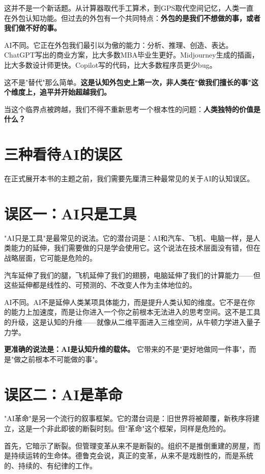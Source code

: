 这并不是一个新话题。从计算器取代手工算术，到GPS取代空间记忆，人类一直在外包认知功能。但过去的外包有一个共同特点：\textbf{外包的是我们不想做的事，或者我们做不好的事。}

AI不同。它正在外包我们最引以为傲的能力：分析、推理、创造、表达。ChatGPT写出的商业方案，比大多数MBA毕业生更好。Midjourney生成的插画，比大多数设计师更快。Copilot写的代码，比大多数程序员更少bug。

这不是"替代"那么简单。\textbf{这是认知外包史上第一次，非人类在"做我们擅长的事"这个维度上，追平并开始超越我们。}

当这个临界点被跨越，我们不得不重新思考一个根本性的问题：\textbf{人类独特的价值是什么？}


\section{三种看待AI的误区}


在正式展开本书的主题之前，我们需要先厘清三种最常见的关于AI的认知误区。

\section{误区一：AI只是工具}


"AI只是工具"是最常见的说法。它的潜台词是：AI和汽车、飞机、电脑一样，是人类能力的延伸，我们需要做的只是学会使用它。这个说法在技术层面没有错，但在战略层面，它可能是危险的。

汽车延伸了我们的腿，飞机延伸了我们的翅膀，电脑延伸了我们的计算能力——但这些延伸都是线性的、可预测的、不改变人作为主体地位的。

AI不同。AI不是延伸人类某项具体能力，而是提升人类认知的维度。它不是在你的能力上加速度，而是让你进入一个你之前根本无法进入的思考空间。这不是工具的升级，这是认知的升维——就像从二维平面进入三维空间，从牛顿力学进入量子力学。

\textbf{更准确的说法是：AI是认知升维的载体。} 它带来的不是"更好地做同一件事"，而是"做之前根本不可能做的事"。

\section{误区二：AI是革命}


"AI革命"是另一个流行的叙事框架。它的潜台词是：旧世界将被颠覆，新秩序将建立，这是一个非此即彼的断裂时刻。但"革命"这个框架，同样是危险的。

首先，它暗示了断裂。但管理变革从来不是断裂的。组织不是推倒重建的房屋，而是持续运转的生命体。德鲁克会说，真正的变革，从来不是戏剧性的，而是系统的、持续的、有纪律的工作。

